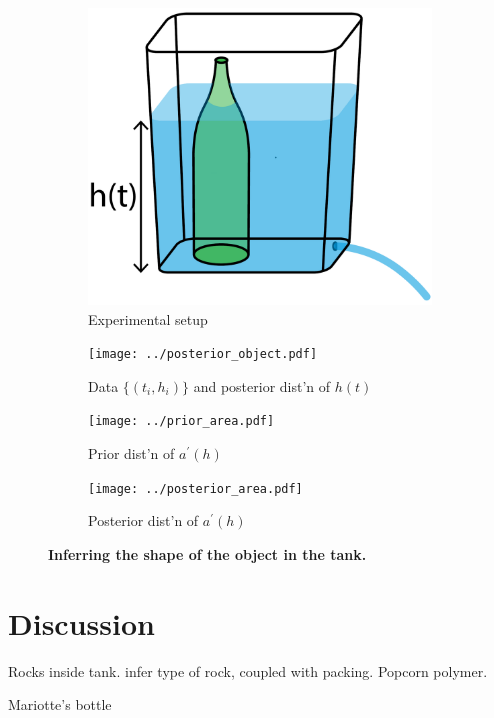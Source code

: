 \documentclass[openacc]{rsproca_new}%
\begin{document}
\begin{figure}[h!]
    \centering
        \begin{subfigure}[b]{0.3\textwidth}
    	\includegraphics[width=\textwidth]{../tank_geometry/tank_w_bottle.pdf}
	\caption{Experimental setup} \label{fig:tank_w_bottle}
    \end{subfigure}
     \begin{subfigure}[b]{0.49\textwidth}
    	\texttt{[image: ../posterior\_object.pdf]}
	\caption{Data $\{(t_i, h_i)\}$ and posterior dist'n of $h(t)$} \label{fig:posterior_object}
    \end{subfigure}
    
     \begin{subfigure}[b]{0.49\textwidth}
    	\texttt{[image: ../prior\_area.pdf]}
	\caption{Prior dist'n of $a^\prime(h)$} \label{fig:prior_area.pdf}
    \end{subfigure}
       \begin{subfigure}[b]{0.49\textwidth}
    	\texttt{[image: ../posterior\_area.pdf]}
	\caption{Posterior dist'n of $a^\prime(h)$} \label{fig:posterior_area.pdf}
    \end{subfigure}
    
  
    \caption{
      \textbf{Inferring the shape of the object in the tank.}
      }
\end{figure}

\section{Discussion}

Rocks inside tank. infer type of rock, coupled with packing. Popcorn polymer.

Mariotte's bottle \cite{kirevs2006mariotte}

\enlargethispage{20pt}




\vskip2pc



\end{document}
